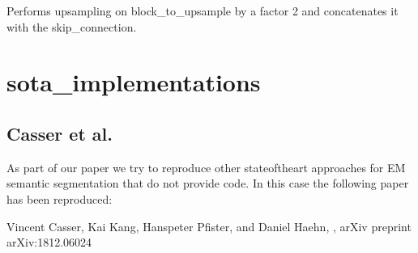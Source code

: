 \documentclass[letterpaper,10pt,english]{sphinxmanual}
\begin{document}

\begin{fulllineitems}
\label{\detokenize{models/tiramisu:models.tiramisu.TransitionUp}}
Performs upsampling on block\_to\_upsample by a factor 2 and concatenates it with the skip\_connection.

\end{fulllineitems}



\section{sota\_implementations}
\label{\detokenize{sota_implementations/sota_implementations:sota-implementations}}\label{\detokenize{sota_implementations/sota_implementations::doc}}

\subsection{Casser et al.}
\label{\detokenize{sota_implementations/casser_2018/casser:casser-et-al}}\label{\detokenize{sota_implementations/casser_2018/casser::doc}}
As part of our paper we try to reproduce other state\sphinxhyphen{}of\sphinxhyphen{}the\sphinxhyphen{}art approaches for EM semantic segmentation
that do not provide code. In this case the following paper has been reproduced:

\begin{sphinxVerbatim}[commandchars=\\\{\}]
Vincent Casser, Kai Kang, Hanspeter Pfister, and Daniel Haehn, 
, arXiv preprint arXiv:1812.06024 
\end{sphinxVerbatim}

 
\end{document}
